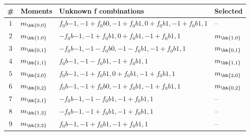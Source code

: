 \begin{table}[!h]
\centering
\begin{tabular}{c l l l}
\toprule
\# & Moments & Unknown f combinations & Selected\\
\midrule
\multirow{ 1}{*}{$1$} & \multirow{ 1}{*}{$m_\bb{0,0}$} & $f_0b{-1,-1}+f_0b{0,-1}+f_0b{1,0}+f_0b{1,-1}+f_0b{1,1}$ & \multirow{ 1}{*}{--}\\ 
\midrule
\multirow{ 1}{*}{$2$} & \multirow{ 1}{*}{$m_\bb{1,0}$} & $-f_0b{-1,-1}+f_0b{1,0}+f_0b{1,-1}+f_0b{1,1}$ & \multirow{ 1}{*}{$m_\bb{1,0}$}\\ 
\midrule
\multirow{ 1}{*}{$3$} & \multirow{ 1}{*}{$m_\bb{0,1}$} & $-f_0b{-1,-1}-f_0b{0,-1}-f_0b{1,-1}+f_0b{1,1}$ & \multirow{ 1}{*}{$m_\bb{0,1}$}\\ 
\midrule
\multirow{ 1}{*}{$4$} & \multirow{ 1}{*}{$m_\bb{1,1}$} & $f_0b{-1,-1}-f_0b{1,-1}+f_0b{1,1}$ & \multirow{ 1}{*}{$m_\bb{1,1}$}\\ 
\midrule
\multirow{ 1}{*}{$5$} & \multirow{ 1}{*}{$m_\bb{2,0}$} & $f_0b{-1,-1}+f_0b{1,0}+f_0b{1,-1}+f_0b{1,1}$ & \multirow{ 1}{*}{$m_\bb{2,0}$}\\ 
\midrule
\multirow{ 1}{*}{$6$} & \multirow{ 1}{*}{$m_\bb{0,2}$} & $f_0b{-1,-1}+f_0b{0,-1}+f_0b{1,-1}+f_0b{1,1}$ & \multirow{ 1}{*}{$m_\bb{0,2}$}\\ 
\midrule
\multirow{ 1}{*}{$7$} & \multirow{ 1}{*}{$m_\bb{2,1}$} & $-f_0b{-1,-1}-f_0b{1,-1}+f_0b{1,1}$ & \multirow{ 1}{*}{--}\\ 
\midrule
\multirow{ 1}{*}{$8$} & \multirow{ 1}{*}{$m_\bb{1,2}$} & $-f_0b{-1,-1}+f_0b{1,-1}+f_0b{1,1}$ & \multirow{ 1}{*}{--}\\ 
\midrule
\multirow{ 1}{*}{$9$} & \multirow{ 1}{*}{$m_\bb{2,2}$} & $f_0b{-1,-1}+f_0b{1,-1}+f_0b{1,1}$ & \multirow{ 1}{*}{--}\\ 
\bottomrule
\end{tabular}\end{table}
